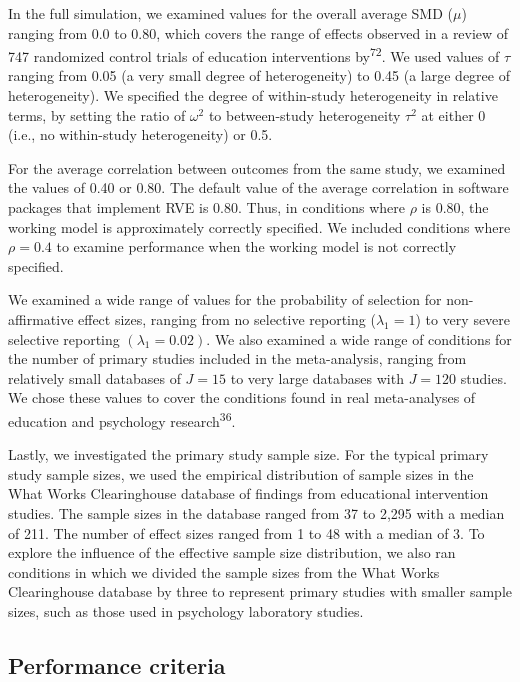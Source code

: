 \documentclass[
  american,
  man, donotrepeattitle,floatsintext]{apa7}
\begin{document}
In the full simulation, we examined values for the overall average SMD (\(\mu\)) ranging from 0.0 to 0.80, which covers the range of effects observed in a review of 747 randomized control trials of education interventions by\textsuperscript{72}.
We used values of \(\tau\) ranging from 0.05 (a very small degree of heterogeneity) to 0.45 (a large degree of heterogeneity).
We specified the degree of within-study heterogeneity in relative terms, by setting the ratio of \(\omega^2\) to between-study heterogeneity \(\tau^2\) at either 0 (i.e., no within-study heterogeneity) or 0.5.

For the average correlation between outcomes from the same study, we
examined the values of 0.40 or 0.80. The default value of the average
correlation in software packages that implement RVE is 0.80. Thus, in
conditions where \(\rho\) is 0.80, the working model is approximately
correctly specified. We included conditions where \(\rho = 0.4\) to examine performance when the
working model is not correctly specified.

We examined a wide range of values for the probability of selection for non-affirmative effect sizes, ranging from no selective reporting (\(\lambda_1 = 1\)) to very severe selective reporting \((\lambda_1 = 0.02)\).
We also examined a wide range of conditions for the number of primary studies included in the meta-analysis, ranging from relatively small databases of \(J = 15\) to very large databases with \(J = 120\) studies.
We chose these values to cover the conditions found in real meta-analyses of education and psychology research\textsuperscript{36}.

Lastly, we investigated the primary study sample size.
For the typical primary study sample sizes, we used the empirical distribution of sample sizes in the What Works Clearinghouse database of findings from educational intervention studies.
The sample sizes in the database ranged from 37 to 2,295 with a median of 211.
The number of effect sizes ranged from 1 to 48 with a median of 3.
To explore the influence of the effective sample size distribution, we also ran conditions in which we divided the sample
sizes from the What Works Clearinghouse database by three to represent primary studies with smaller sample sizes,
such as those used in psychology laboratory studies.

\subsection{Performance criteria}\label{performance-criteria}
\end{document}
